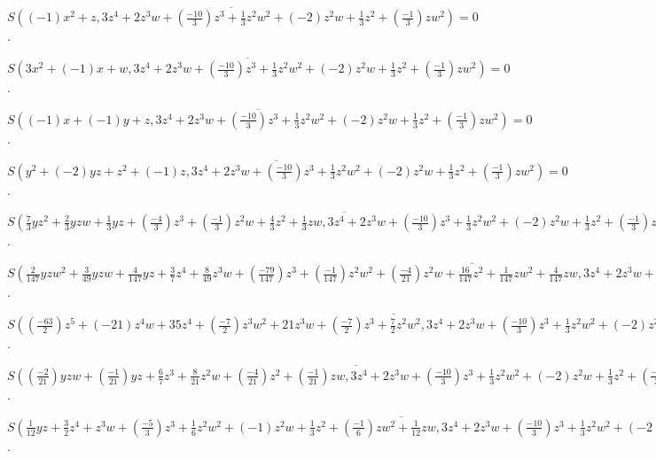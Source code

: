 \documentclass{jsarticle}
\begin{document}
$\overline{S((-1)x^{2}+z, 3z^{4}+2z^{3}w+(\frac{-10}{3})z^{3}+\frac{1}{3}z^{2}w^{2}+(-2)z^{2}w+\frac{1}{3}z^{2}+(\frac{-1}{3})zw^{2})} = 0$.  

$\overline{S(3x^{2}+(-1)x+w, 3z^{4}+2z^{3}w+(\frac{-10}{3})z^{3}+\frac{1}{3}z^{2}w^{2}+(-2)z^{2}w+\frac{1}{3}z^{2}+(\frac{-1}{3})zw^{2})} = 0$.  

$\overline{S((-1)x+(-1)y+z, 3z^{4}+2z^{3}w+(\frac{-10}{3})z^{3}+\frac{1}{3}z^{2}w^{2}+(-2)z^{2}w+\frac{1}{3}z^{2}+(\frac{-1}{3})zw^{2})} = 0$.  

$\overline{S(y^{2}+(-2)yz+z^{2}+(-1)z, 3z^{4}+2z^{3}w+(\frac{-10}{3})z^{3}+\frac{1}{3}z^{2}w^{2}+(-2)z^{2}w+\frac{1}{3}z^{2}+(\frac{-1}{3})zw^{2})} = 0$.  

$\overline{S(\frac{7}{3}yz^{2}+\frac{2}{3}yzw+\frac{1}{3}yz+(\frac{-4}{3})z^{3}+(\frac{-1}{3})z^{2}w+\frac{4}{3}z^{2}+\frac{1}{3}zw, 3z^{4}+2z^{3}w+(\frac{-10}{3})z^{3}+\frac{1}{3}z^{2}w^{2}+(-2)z^{2}w+\frac{1}{3}z^{2}+(\frac{-1}{3})zw^{2})} = 0$.  

$\overline{S(\frac{2}{147}yzw^{2}+\frac{3}{49}yzw+\frac{4}{147}yz+\frac{3}{7}z^{4}+\frac{8}{49}z^{3}w+(\frac{-79}{147})z^{3}+(\frac{-1}{147})z^{2}w^{2}+(\frac{-4}{21})z^{2}w+\frac{16}{147}z^{2}+\frac{1}{147}zw^{2}+\frac{4}{147}zw, 3z^{4}+2z^{3}w+(\frac{-10}{3})z^{3}+\frac{1}{3}z^{2}w^{2}+(-2)z^{2}w+\frac{1}{3}z^{2}+(\frac{-1}{3})zw^{2})} = 0$.  

$\overline{S((\frac{-63}{2})z^{5}+(-21)z^{4}w+35z^{4}+(\frac{-7}{2})z^{3}w^{2}+21z^{3}w+(\frac{-7}{2})z^{3}+\frac{7}{2}z^{2}w^{2}, 3z^{4}+2z^{3}w+(\frac{-10}{3})z^{3}+\frac{1}{3}z^{2}w^{2}+(-2)z^{2}w+\frac{1}{3}z^{2}+(\frac{-1}{3})zw^{2})} = 0$.  

$\overline{S((\frac{-2}{21})yzw+(\frac{-1}{21})yz+\frac{6}{7}z^{3}+\frac{8}{21}z^{2}w+(\frac{-4}{21})z^{2}+(\frac{-1}{21})zw, 3z^{4}+2z^{3}w+(\frac{-10}{3})z^{3}+\frac{1}{3}z^{2}w^{2}+(-2)z^{2}w+\frac{1}{3}z^{2}+(\frac{-1}{3})zw^{2})} = 0$.  

$\overline{S(\frac{1}{12}yz+\frac{3}{2}z^{4}+z^{3}w+(\frac{-5}{3})z^{3}+\frac{1}{6}z^{2}w^{2}+(-1)z^{2}w+\frac{1}{3}z^{2}+(\frac{-1}{6})zw^{2}+\frac{1}{12}zw, 3z^{4}+2z^{3}w+(\frac{-10}{3})z^{3}+\frac{1}{3}z^{2}w^{2}+(-2)z^{2}w+\frac{1}{3}z^{2}+(\frac{-1}{3})zw^{2})} = 0$.  
\end{document}
